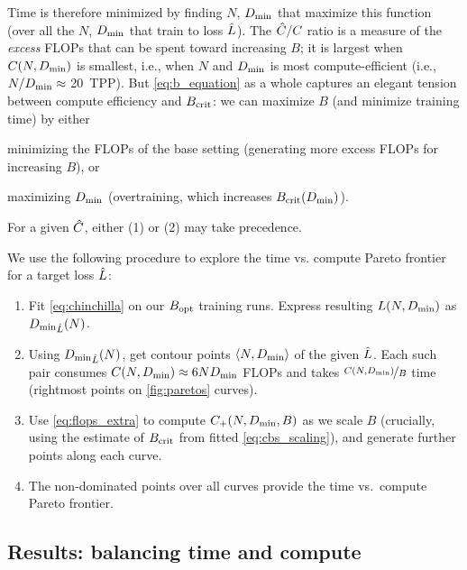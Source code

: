 Time is therefore minimized by finding $N$, $D_{\text{min}}$ that maximize this
function (over all the $N$, $D_{\text{min}}$ that train to loss $\hat{L}$).
%
The ${\hat{C}}/C$ ratio is a measure of the \emph{excess} FLOPs that can
be spent toward increasing $B$; it is largest when $C(N, D_{\text{min}})$ is
smallest, i.e., when $N$ and $D_{\text{min}}$ is most compute-efficient (i.e.,
$N/D_{\text{min}} \approx$ 20~TPP).
%
But \cref{eq:b_equation} as a whole captures an elegant tension
between compute efficiency and $B_{\text{crit}}$: we can maximize $B$ (and
minimize training time) by either
\begin{inparaenum}[(1)]
 \item minimizing the FLOPs of the base setting (generating more
   excess FLOPs for increasing $B$), or
 \item maximizing $D_{\text{min}}$ (overtraining, which increases $B_{\text{crit}}(D_{\text{min}})$).
\end{inparaenum}
%
For a given $\hat{C}$, either (1) or (2) may take
precedence.

We use the following procedure to explore the time vs\@. compute
Pareto frontier for a target loss $\hat{L}$:
\begin{enumerate}
  \item Fit \cref{eq:chinchilla} on our $B_{\text{opt}}$ training runs.
    Express resulting $L(N,D_{\text{min}})$ as ${D_{\text{min}}}_{\hat{L}}(N)$.
  \item Using ${D_{\text{min}}}_{\hat{L}}(N)$, get contour points $\langle N,
    {D_{\text{min}}} \rangle$ of the given $\hat{L}$.
    Each such pair consumes $C(N, D_{\text{min}}) \approx 6 N D_{\text{min}}$
    FLOPs and takes $\nicefrac{C(N, D_{\text{min}})}{B}$ time (rightmost points
    on \cref{fig:paretos} curves).
  \item Use \cref{eq:flops_extra} to compute $C_{\text{+}}(N,D_{\text{min}},B)$ as we scale
    $B$ (crucially, using the estimate of $B_{\text{crit}}$ from fitted
    \cref{eq:cbs_scaling}), and generate further points along each
    curve.
  \item The non-dominated points over all curves provide the time
    vs.\ compute Pareto frontier.
\end{enumerate}

\subsection{Results: balancing time and compute}


